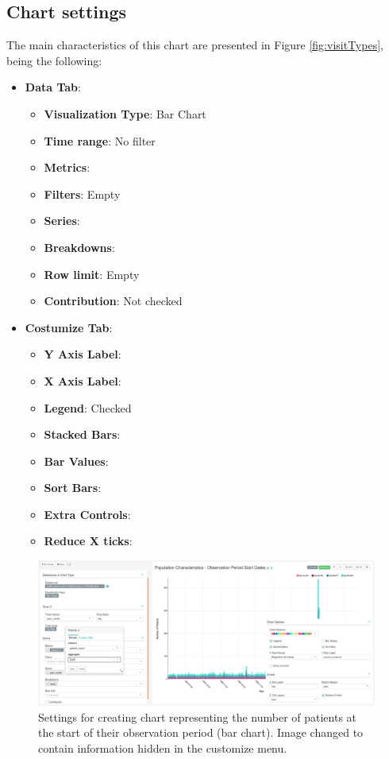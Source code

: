 \documentclass[]{book}
\providecommand{\tightlist}{%
  \setlength{\itemsep}{0pt}\setlength{\parskip}{0pt}}
\begin{document}
\subsection{Chart settings}\label{chart-settings-16}

The main characteristics of this chart are presented in Figure
\ref{fig:visitTypes}, being the following:

\begin{itemize}
\tightlist
\item
  \textbf{Data Tab}:

  \begin{itemize}
  \tightlist
  \item
    \textbf{Visualization Type}: Bar Chart
  \item
    \textbf{Time range}: No filter
  \item
    \textbf{Metrics}:
  \item
    \textbf{Filters}: Empty
  \item
    \textbf{Series}:
  \item
    \textbf{Breakdowns}:
  \item
    \textbf{Row limit}: Empty
  \item
    \textbf{Contribution}: Not checked
  \end{itemize}
\item
  \textbf{Costumize Tab}:

  \begin{itemize}
  \tightlist
  \item
    \textbf{Y Axis Label}:
  \item
    \textbf{X Axis Label}:
  \item
    \textbf{Legend}: Checked
  \item
    \textbf{Stacked Bars}:
  \item
    \textbf{Bar Values}:
  \item
    \textbf{Sort Bars}:
  \item
    \textbf{Extra Controls}:
  \item
    \textbf{Reduce X ticks}:
  \end{itemize}
\end{itemize}

\begin{figure}
\includegraphics[width=1\linewidth]{images/populationCharacteristicsObservationPeriodStartDates} \caption{Settings for creating chart representing the number of patients at the start of their observation period (bar chart). Image changed to contain information hidden in the customize menu.}\label{fig:visitTypes21}
\end{figure}


\end{document}
